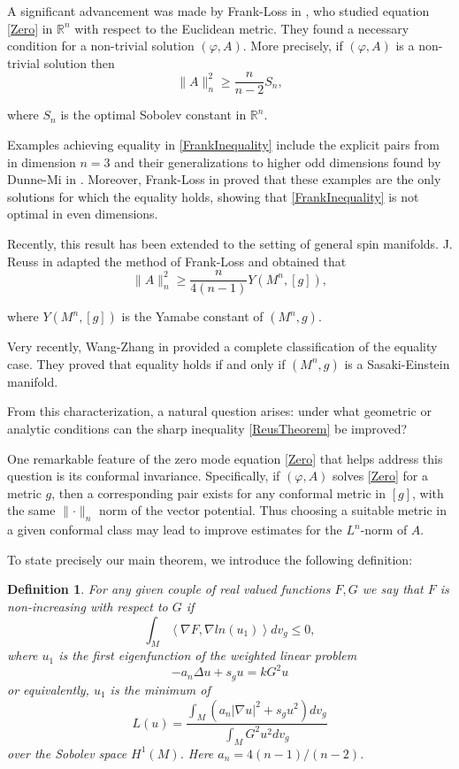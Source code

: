 \documentclass[11pt]{amsart}
\theoremstyle{plain}
\newtheorem{definition}[theorem]{Definition}
\numberwithin{equation}{section}
\theoremstyle{plain}
\begin{document}
A significant advancement was made by Frank-Loss in \cite{Frank-Loss2}, who studied equation \eqref{Zero}  in $\mathbb{R}^n$ with respect to the Euclidean metric. They found a necessary condition for a non-trivial solution $(\varphi, A)$. More precisely, if $(\varphi,A)$ is a non-trivial solution then 
\begin{equation}\label{FrankInequality}
\parallel A\parallel_n^2\geq \frac{n}{n-2}S_n,
\end{equation}

where $S_n$ is the optimal Sobolev constant in $\mathbb{R}^n$. 

Examples achieving equality in \eqref{FrankInequality} include the explicit pairs from \cite{Loss-Yau}  in dimension $n=3$ and their generalizations to higher odd dimensions found by Dunne-Mi in \cite{Dunne}. Moreover, Frank-Loss  in \cite{Frank-Loss2} proved that these examples are  the only solutions for which the equality holds, showing that \eqref{FrankInequality} is not optimal in even dimensions.

Recently, this result has been extended to the setting of general spin manifolds. J. Reuss in \cite{Reus} adapted the method of Frank-Loss and obtained that 
\begin{equation}\label{ReusTheorem}
\parallel A\parallel_n^2\geq \frac{n}{4(n-1)}Y(M^n,[g]),
\end{equation}


where $Y(M^n,[g])$ is the Yamabe constant of $(M^n,g)$.

Very recently, Wang-Zhang in \cite{Wang} provided a complete classification of the equality case. They proved that equality holds if and only if $(M^n,g)$ is a Sasaki-Einstein manifold. 

From this characterization, a natural question arises: under what geometric or analytic conditions can the sharp inequality \eqref{ReusTheorem} be improved?

One remarkable feature of the zero mode equation \eqref{Zero}  that helps address this question is its conformal invariance. Specifically, if $(\varphi,A)$ solves \eqref{Zero} for a metric $g$, then a corresponding pair exists for any conformal metric in $[g]$, with the same $\parallel\cdot \parallel_n$ norm of the vector potential. Thus choosing a suitable metric in a given conformal class may lead to improve estimates for the $L^n$-norm of $A$.

To state precisely our main theorem, we introduce the following definition:

\begin{definition}
For any given couple of real valued functions $F,G$ we say that $F$ is non-increasing with respect to $G$ if $$\int_M\left\langle\nabla F,\nabla ln(u_1)\right\rangle dv_g\leq 0,$$
where $u_1$ is the first eigenfunction of the weighted linear problem $$-a_n\Delta u+s_gu=kG^2u$$
or equivalently, $u_1$ is the minimum of $$L(u)=\dfrac{\int_M\left(a_n|\nabla u|^2+s_gu^2\right)dv_g}{\int_MG^2u^2dv_g}$$
over the Sobolev space $H^1(M)$. Here $a_n=4(n-1)/(n-2)$.
\end{definition}
\end{document}

